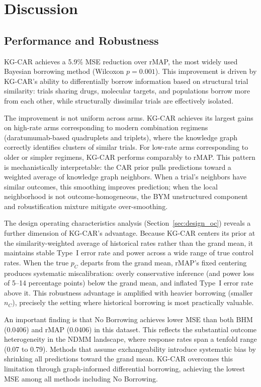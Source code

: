 \documentclass[12pt]{article}
\begin{document}
\section{Discussion}
\label{sec:discussion}

\subsection{Performance and Robustness}
\label{sec:disc_performance}

KG-CAR achieves a 5.9\% MSE reduction over rMAP, the most widely used Bayesian borrowing method (Wilcoxon $p = 0.001$). This improvement is driven by KG-CAR's ability to differentially borrow information based on structural trial similarity: trials sharing drugs, molecular targets, and populations borrow more from each other, while structurally dissimilar trials are effectively isolated.

The improvement is not uniform across arms. KG-CAR achieves its largest gains on high-rate arms corresponding to modern combination regimens (daratumumab-based quadruplets and triplets), where the knowledge graph correctly identifies clusters of similar trials. For low-rate arms corresponding to older or simpler regimens, KG-CAR performs comparably to rMAP. This pattern is mechanistically interpretable: the CAR prior pulls predictions toward a weighted average of knowledge graph neighbors. When a trial's neighbors have similar outcomes, this smoothing improves prediction; when the local neighborhood is not outcome-homogeneous, the BYM unstructured component and robustification mixture mitigate over-smoothing.

The design operating characteristics analysis (Section~\ref{sec:design_oc}) reveals a further dimension of KG-CAR's advantage. Because KG-CAR centers its prior at the similarity-weighted average of historical rates rather than the grand mean, it maintains stable Type~I error rate and power across a wide range of true control rates. When the true $p_C$ departs from the grand mean, rMAP's fixed centering produces systematic miscalibration: overly conservative inference (and power loss of 5--14 percentage points) below the grand mean, and inflated Type~I error rate above it. This robustness advantage is amplified with heavier borrowing (smaller $n_C$), precisely the setting where historical borrowing is most practically valuable.

An important finding is that No Borrowing achieves lower MSE than both BHM (0.0406) and rMAP (0.0406) in this dataset. This reflects the substantial outcome heterogeneity in the NDMM landscape, where response rates span a tenfold range (0.07 to 0.79). Methods that assume exchangeability introduce systematic bias by shrinking all predictions toward the grand mean. KG-CAR overcomes this limitation through graph-informed differential borrowing, achieving the lowest MSE among all methods including No Borrowing.
\end{document}
